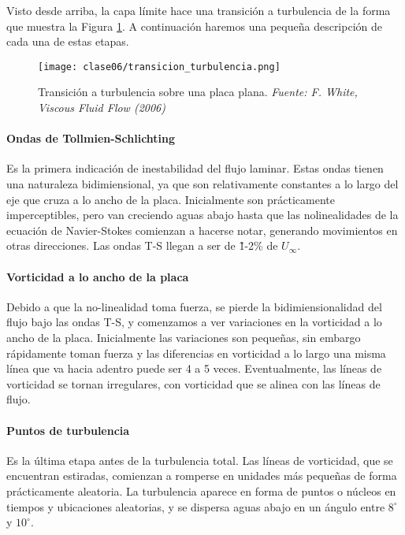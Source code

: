 Visto desde arriba, la capa límite hace una transición a turbulencia de la forma que muestra la Figura \ref{fig:transicion_turbulencia}.
A continuación haremos una pequeña descripción de cada una de estas etapas.
%
\begin{figure}[h!]
\centering
\texttt{[image: clase06/transicion\_turbulencia.png]}
\caption{Transición a turbulencia sobre una placa plana. \emph{Fuente: F. White, Viscous Fluid Flow (2006)}}
\label{fig:transicion_turbulencia}
\end{figure}

\paragraph*{Ondas de Tollmien-Schlichting}
Es la primera indicación de inestabilidad del flujo laminar. 
Estas ondas tienen una naturaleza bidimiensional, ya que son relativamente constantes a lo largo del eje que cruza a lo ancho de la placa.
Inicialmente son prácticamente imperceptibles, pero van creciendo aguas abajo hasta que las nolinealidades de la ecuación de Navier-Stokes comienzan a hacerse notar, generando movimientos en otras direcciones.
Las ondas T-S llegan a ser de \~1-2\% de $U_\infty$.

\paragraph*{Vorticidad a lo ancho de la placa}
Debido a que la no-linealidad toma fuerza, se pierde la bidimiensionalidad del flujo bajo las ondas T-S, y comenzamos a ver variaciones en la vorticidad a lo ancho de la placa.
Inicialmente las variaciones son pequeñas, sin embargo rápidamente toman fuerza y las diferencias en vorticidad a lo largo una misma línea que va hacia adentro puede ser 4 a 5 veces.
Eventualmente, las líneas de vorticidad se tornan irregulares, con vorticidad que se alinea con las líneas de flujo.

\paragraph*{Puntos de turbulencia}
Es la última etapa antes de la turbulencia total.
Las líneas de vorticidad, que se encuentran estiradas, comienzan a romperse en unidades más pequeñas de forma prácticamente aleatoria. 
La turbulencia aparece en forma de puntos o núcleos en tiempos y ubicaciones aleatorias, y se dispersa aguas abajo en un ángulo entre $8^\circ$ y $10^\circ$.

